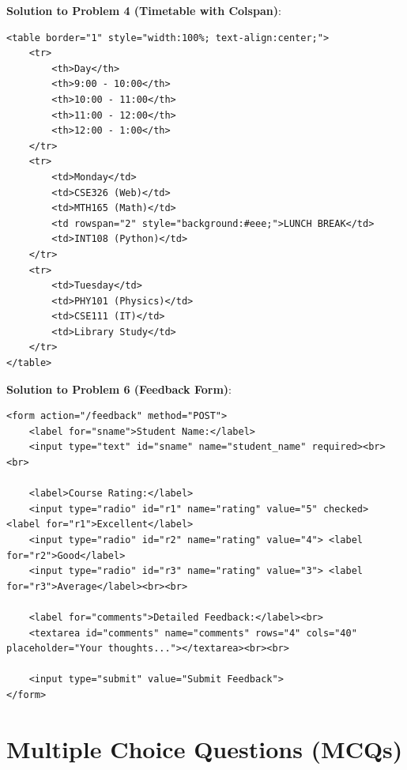 \begin{solutionbox}
\noindent\textbf{Solution to Problem 4 (Timetable with Colspan)}:
\begin{lstlisting}[language=HTML5]
<table border="1" style="width:100%; text-align:center;">
    <tr>
        <th>Day</th>
        <th>9:00 - 10:00</th>
        <th>10:00 - 11:00</th>
        <th>11:00 - 12:00</th>
        <th>12:00 - 1:00</th>
    </tr>
    <tr>
        <td>Monday</td>
        <td>CSE326 (Web)</td>
        <td>MTH165 (Math)</td>
        <td rowspan="2" style="background:#eee;">LUNCH BREAK</td>
        <td>INT108 (Python)</td>
    </tr>
    <tr>
        <td>Tuesday</td>
        <td>PHY101 (Physics)</td>
        <td>CSE111 (IT)</td>
        <td>Library Study</td>
    </tr>
</table>
\end{lstlisting}

\noindent\textbf{Solution to Problem 6 (Feedback Form)}:
\begin{lstlisting}[language=HTML5]
<form action="/feedback" method="POST">
    <label for="sname">Student Name:</label>
    <input type="text" id="sname" name="student_name" required><br><br>

    <label>Course Rating:</label>
    <input type="radio" id="r1" name="rating" value="5" checked> <label for="r1">Excellent</label>
    <input type="radio" id="r2" name="rating" value="4"> <label for="r2">Good</label>
    <input type="radio" id="r3" name="rating" value="3"> <label for="r3">Average</label><br><br>

    <label for="comments">Detailed Feedback:</label><br>
    <textarea id="comments" name="comments" rows="4" cols="40" placeholder="Your thoughts..."></textarea><br><br>

    <input type="submit" value="Submit Feedback">
</form>
\end{lstlisting}
\end{solutionbox}

\section{Multiple Choice Questions (MCQs)}

